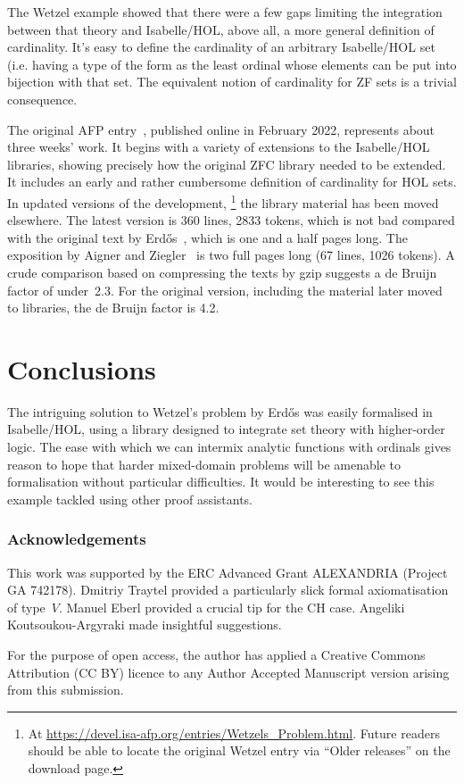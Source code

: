 \documentclass[runningheads]{llncs}
\begin{document}
The Wetzel example showed that there were a few gaps limiting the integration between that theory and Isabelle/HOL, above all, a more general definition of cardinality. It's easy to define the cardinality of an arbitrary Isabelle/HOL set (i.e. having a type of the form  as the least ordinal whose elements can be put into bijection with that set.
The equivalent notion of cardinality for ZF sets is a trivial consequence.

The original AFP entry~\cite{Wetzels_Problem-AFP}, published online in February 2022, represents about three weeks' work.
It begins with a variety of extensions to the Isabelle/HOL libraries, showing precisely how the original ZFC library needed to be extended.
It includes an early and rather cumbersome definition of cardinality for HOL sets. In updated versions of the development,%
\footnote{At \url{https://devel.isa-afp.org/entries/Wetzels_Problem.html}. Future readers should be able to locate the original Wetzel entry via ``Older releases'' on the download page.}
%
the library material has been moved elsewhere. The latest version is 360 lines, 2833 tokens, which is not bad compared with the original text by Erdős~\cite{erdos-interpolation}, which is one and a half pages long. The exposition by Aigner and Ziegler~\cite{aigner-proofs} is two full pages long (67 lines, 1026 tokens). A crude comparison based on compressing the texts by gzip suggests a de Bruijn factor of under~2.3. For the original version, including the material later moved to libraries, the de Bruijn factor is 4.2.

\section{Conclusions}

The intriguing solution to Wetzel's problem by Erd\H{o}s was easily formalised in Isabelle/HOL, using a library designed to integrate set theory with higher-order logic.
The ease with which we can intermix analytic functions with ordinals gives reason to hope that harder mixed-domain problems will be amenable to formalisation without particular difficulties.
It would be interesting to see this example tackled using other proof assistants.

\subsubsection{Acknowledgements} 
This work was supported by the ERC Advanced Grant ALEXANDRIA (Project GA 742178). 
Dmitriy Traytel provided a particularly slick formal axiomatisation of type~$V$. 
Manuel Eberl provided a crucial tip for the CH case.
Angeliki Koutsoukou-Argyraki made insightful suggestions.

For the purpose of open access, the author has applied a Creative Commons Attribution (CC BY) licence to any Author Accepted Manuscript version arising from this submission.




\end{document}
